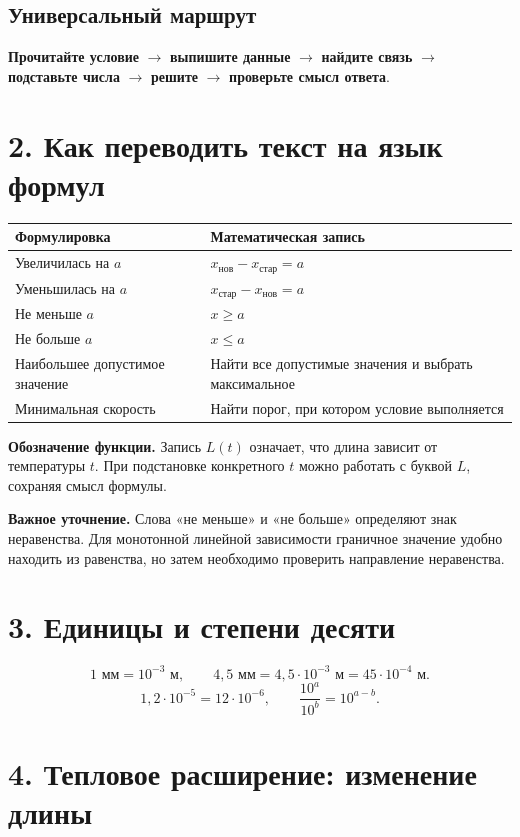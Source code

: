 \documentclass[a4paper,11pt]{article}
\newcommand{\key}[1]{\textcolor{darkaccent}{\textbf{#1}}}
\begin{document}
\subsection*{Универсальный маршрут}
\key{Прочитайте условие} $\longrightarrow$ \key{выпишите данные} $\longrightarrow$
\key{найдите связь} $\longrightarrow$ \key{подставьте числа} $\longrightarrow$
\key{решите} $\longrightarrow$ \key{проверьте смысл ответа}.

\section*{2. Как переводить текст на язык формул}

\begin{tabularx}{\linewidth}{@{}p{.35\linewidth}X@{}}
\toprule
Формулировка & Математическая запись\\
\midrule
Увеличилась на \(a\) & \(x_{\text{нов}}-x_{\text{стар}}=a\)\\
Уменьшилась на \(a\) & \(x_{\text{стар}}-x_{\text{нов}}=a\)\\
Не меньше \(a\) & \(x\ge a\)\\
Не больше \(a\) & \(x\le a\)\\
Наибольшее допустимое значение & Найти все допустимые значения и выбрать максимальное\\
Минимальная скорость & Найти порог, при котором условие выполняется\\
\bottomrule
\end{tabularx}

\textcolor{accent}{\textbf{Обозначение функции.}}
Запись \(L(t)\) означает, что длина зависит от температуры \(t\).
При подстановке конкретного \(t\) можно работать с буквой \(L\), сохраняя смысл формулы.

\textcolor{accent}{\textbf{Важное уточнение.}}
Слова «не меньше» и «не больше» определяют знак неравенства.
Для монотонной линейной зависимости граничное значение удобно находить из
равенства, но затем необходимо проверить направление неравенства.

\section*{3. Единицы и степени десяти}
\[
1\text{ мм}=10^{-3}\text{ м},\qquad
4{,}5\text{ мм}=4{,}5\cdot10^{-3}\text{ м}
=45\cdot10^{-4}\text{ м}.
\]
\[
1{,}2\cdot10^{-5}=12\cdot10^{-6},\qquad
\frac{10^a}{10^b}=10^{a-b}.
\]
\clearpage
\section*{4. Тепловое расширение: изменение длины}
\end{document}
